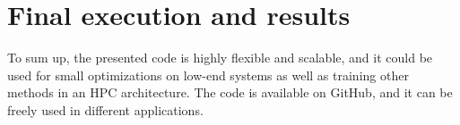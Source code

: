 \documentclass[10pt]{article}
\begin{document}
\section{Final execution and results}
To sum up, the presented code is highly flexible and scalable, and it could be used for small optimizations on low-end systems as well as training other methods in an HPC architecture.
The code is available on GitHub, and it can be freely used in different applications.\cite{GitHub}



\end{document}

